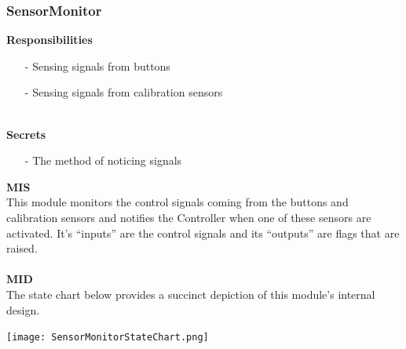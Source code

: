 \documentclass[titlepage]{article}
\begin{document}
\subsubsection{SensorMonitor}
\textbf{Responsibilities}
\begin{itemize}
	\item[-] Sensing signals from buttons
	\item[-] Sensing signals from calibration sensors
\end{itemize}~\\
\textbf{Secrets}
\begin{itemize}
	\item[-] The method of noticing signals
\end{itemize}
\newpage
\textbf{MIS}\\[2mm]
This module monitors the control signals coming from the buttons and calibration sensors and notifies the Controller when one of these sensors are activated. It's ``inputs'' are the control signals and its ``outputs'' are flags that are raised.
\\\\
\textbf{MID}\\[2mm]
The state chart below provides a succinct depiction of this module's internal design.\\
\begin{center}
	\texttt{[image: SensorMonitorStateChart.png]}
\label{fig:SensorMonitorStateChart}
\end{center}~\\
\end{document}
